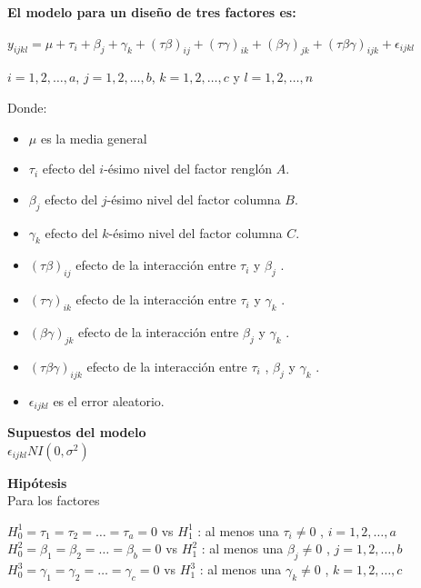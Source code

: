 \textbf{El modelo para un diseño de tres factores es:}\\
	\begin{center}
	$y_{ijkl}=\mu + \tau_{i} + \beta_{j} + \gamma_{k} + (\tau \beta)_{ij} +(\tau \gamma)_{ik} + (\beta \gamma)_{jk} + (\tau \beta \gamma)_{ijk} + \epsilon_{ijkl} $

	$i = 1,2, \dots, a$, $j = 1,2, \dots, b$, $k = 1,2, \dots, c$  y $l = 1,2, \dots, n$
 \end{center}
 
Donde:
\begin{itemize}
	\item $\mu$ es la media general
	\item $\tau_{i}$ efecto del $i$-ésimo nivel del factor renglón $A$.
	\item $\beta_{j}$ efecto del $j$-ésimo nivel del factor columna $B$.
	\item $\gamma_{k} $ efecto del $k$-ésimo nivel del factor columna $C$.
	\item $(\tau \beta)_{ij} $ efecto de la interacción entre $\tau_{i}$  y  $\beta_{j}$ .
	\item $(\tau \gamma)_{ik}$ efecto de la interacción entre  $\tau_{i}$  y  $\gamma_{k}$ .
	\item $(\beta \gamma)_{jk}$ efecto de la interacción entre $\beta_{j}$ y  $\gamma_{k}$ .
	\item $(\tau \beta \gamma)_{ijk}$ efecto de la interacción entre $\tau_{i}$  , $\beta_{j}$ y $\gamma_{k}$ .
	\item $\epsilon_{ijkl}$ es el error aleatorio.
\end{itemize}


\textbf{Supuestos del modelo}\\
 $\epsilon_{ijkl} NI (0, \sigma^{2})$

\textbf{Hipótesis}\\
Para los factores
\begin{center}
	$H^{1}_{0} =\tau_{1} = \tau_{2} = \dots = \tau_{a} = 0$ vs $H^{1}_{1}$ : al menos una $\tau_{i} \neq 0$ , $i = 1,2, \dots, a$ \\
	$H^{2}_{0} =\beta_{1} = \beta_{2} = \dots = \beta_{b} = 0 $ vs $H^{2}_{1}$ : al menos una $\beta_{j} \neq 0$ , $j = 1,2, \dots,b$ \\
	$H^{3}_{0} =\gamma_{1} = \gamma_{2} = \dots = \gamma_{c} = 0 $ vs $H^{3}_{1}$ : al menos una $\gamma_{k} \neq 0$ , $k = 1,2, \dots,c$ \\
\end{center}

